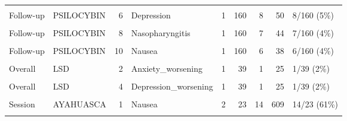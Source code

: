 \begin{table}[!h]
{\begin{tabular}[t]{llrlrrrrl}
\cellcolor{gray!10}{Follow-up} & \cellcolor{gray!10}{PSILOCYBIN} & \cellcolor{gray!10}{5} & \cellcolor{gray!10}{Panic reaction} & \cellcolor{gray!10}{1} & \cellcolor{gray!10}{160} & \cellcolor{gray!10}{9} & \cellcolor{gray!10}{56} & \cellcolor{gray!10}{9/160 (6\%)}\\
\addlinespace
Follow-up & PSILOCYBIN & 6 & Depression & 1 & 160 & 8 & 50 & 8/160 (5\%)\\
\cellcolor{gray!10}{Follow-up} & \cellcolor{gray!10}{PSILOCYBIN} & \cellcolor{gray!10}{7} & \cellcolor{gray!10}{Abdominal pain} & \cellcolor{gray!10}{1} & \cellcolor{gray!10}{160} & \cellcolor{gray!10}{7} & \cellcolor{gray!10}{44} & \cellcolor{gray!10}{7/160 (4\%)}\\
Follow-up & PSILOCYBIN & 8 & Nasopharyngitis & 1 & 160 & 7 & 44 & 7/160 (4\%)\\
\cellcolor{gray!10}{Follow-up} & \cellcolor{gray!10}{PSILOCYBIN} & \cellcolor{gray!10}{9} & \cellcolor{gray!10}{Physical pain} & \cellcolor{gray!10}{1} & \cellcolor{gray!10}{160} & \cellcolor{gray!10}{7} & \cellcolor{gray!10}{44} & \cellcolor{gray!10}{7/160 (4\%)}\\
Follow-up & PSILOCYBIN & 10 & Nausea & 1 & 160 & 6 & 38 & 6/160 (4\%)\\
\addlinespace
\cellcolor{gray!10}{Overall} & \cellcolor{gray!10}{LSD} & \cellcolor{gray!10}{1} & \cellcolor{gray!10}{Adhd\_exacerbation} & \cellcolor{gray!10}{1} & \cellcolor{gray!10}{40} & \cellcolor{gray!10}{1} & \cellcolor{gray!10}{25} & \cellcolor{gray!10}{1/40 (2\%)}\\
Overall & LSD & 2 & Anxiety\_worsening & 1 & 39 & 1 & 25 & 1/39 (2\%)\\
\cellcolor{gray!10}{Overall} & \cellcolor{gray!10}{LSD} & \cellcolor{gray!10}{3} & \cellcolor{gray!10}{Depression} & \cellcolor{gray!10}{1} & \cellcolor{gray!10}{39} & \cellcolor{gray!10}{1} & \cellcolor{gray!10}{25} & \cellcolor{gray!10}{1/39 (2\%)}\\
Overall & LSD & 4 & Depression\_worsening & 1 & 39 & 1 & 25 & 1/39 (2\%)\\
\cellcolor{gray!10}{Overall} & \cellcolor{gray!10}{LSD} & \cellcolor{gray!10}{5} & \cellcolor{gray!10}{Feeling\_intoxicated} & \cellcolor{gray!10}{1} & \cellcolor{gray!10}{79} & \cellcolor{gray!10}{2} & \cellcolor{gray!10}{25} & \cellcolor{gray!10}{2/79 (2\%)}\\
\addlinespace
Session & AYAHUASCA & 1 & Nausea & 2 & 23 & 14 & 609 & 14/23 (61\%)\\
\cellcolor{gray!10}{Session} & \cellcolor{gray!10}{AYAHUASCA} & \cellcolor{gray!10}{2} & \cellcolor{gray!10}{Restlessness} & \cellcolor{gray!10}{1} & \cellcolor{gray!10}{14} & \cellcolor{gray!10}{7} & \cellcolor{gray!10}{500} & \cellcolor{gray!10}{7/14 (50\%)}\\

\end{tabular}}
\end{table}
